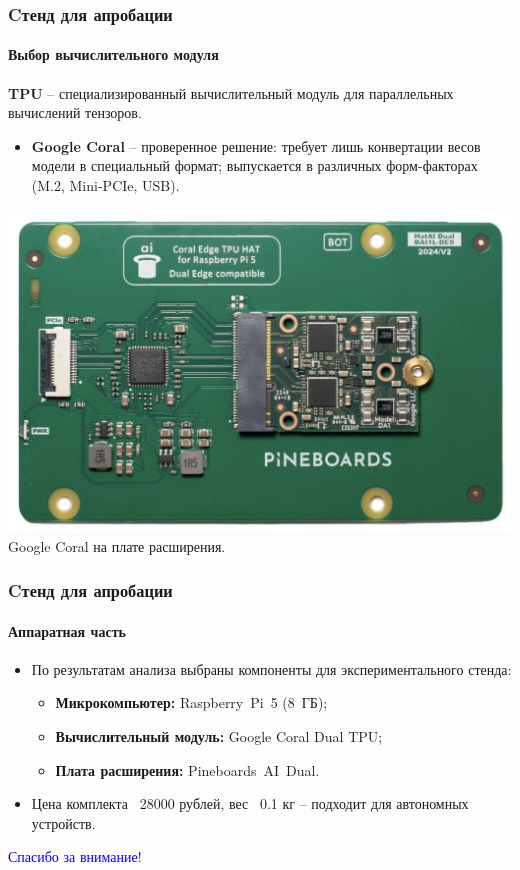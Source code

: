 \documentclass{beamer} %
\begin{document}
\begin{frame}
  \frametitle{Cтенд для апробации}
  \framesubtitle{Выбор вычислительного модуля}
  \textbf{TPU} -- специализированный вычислительный модуль для параллельных вычислений тензоров.
  \begin{itemize}
      \item \textbf{Google Coral} – проверенное решение: требует лишь конвертации весов модели в специальный формат; выпускается в различных форм-факторах (M.2, Mini-PCIe, USB).
  \end{itemize}
  \centering
  \includegraphics[width=0.5\linewidth]{images/presentation/tpu.png}\\
  \small Google Coral на плате расширения.
\end{frame}


\begin{frame}
  \frametitle{Cтенд для апробации}
  \framesubtitle{Аппаратная часть}
  \begin{itemize}
      \item По результатам анализа выбраны компоненты для экспериментального стенда:
      \begin{itemize}
          \item \textbf{Микрокомпьютер:} Raspberry Pi 5 (8 ГБ);
          \item \textbf{Вычислительный модуль:} Google Coral Dual TPU;
          \item \textbf{Плата расширения:} Pineboards AI Dual.
      \end{itemize}
      \item Цена комплекта ~28000 рублей, вес ~0.1 кг -- подходит для автономных устройств.
  \end{itemize}
\end{frame}


\begin{frame}
  \centering \Huge \textcolor{blue}{Спасибо за внимание!}
\end{frame}
\end{document}
